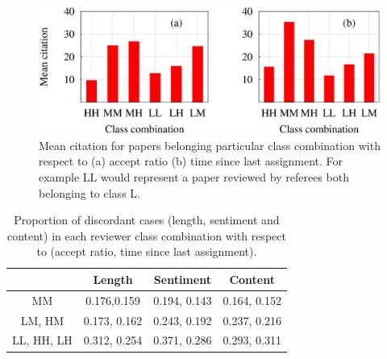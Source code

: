 \begin{figure}
 \centering
 \includegraphics[scale = 0.3]{./texfiles/Chapter_4/cikm_17/figures/ref_performance.eps}
 \caption{\label{ref_perf} Mean citation for papers belonging particular class combination with respect to (a) accept ratio (b) time since last assignment. For example LL would represent a paper reviewed by referees both 
 belonging to class L.\vspace{4mm}}
\end{figure}



\begin{table}
\centering
\caption{Proportion of discordant cases (length, sentiment and content) in each reviewer class combination with respect to (accept ratio, time since 
last assignment).\vspace{3mm} }
\label{tab:dis}
\begin{tabular}{c|c|c|c}
\hline
           & Length       & Sentiment    & Content      \\ \hline
MM         & 0.176,0.159  & 0.194, 0.143 & 0.164, 0.152 \\ 
LM, HM     & 0.173, 0.162 & 0.243, 0.192 & 0.237, 0.216 \\ 
LL, HH, LH & 0.312, 0.254 & 0.371, 0.286 & 0.293, 0.311 \\ \hline
\end{tabular}
\vspace{4mm}
\end{table}



\medskip
